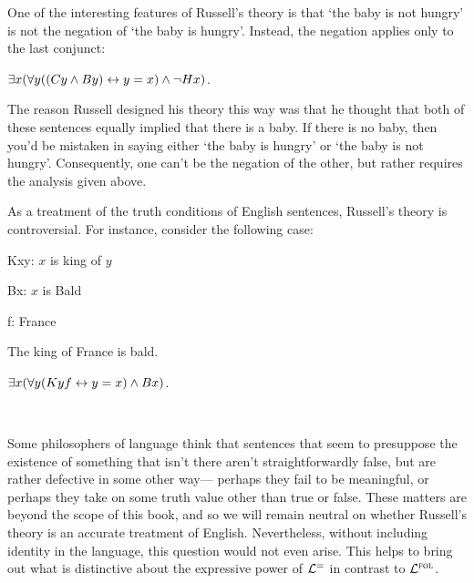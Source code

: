 One of the interesting features of Russell's theory is that `the baby is not hungry' is not the negation of `the baby is hungry'.
Instead, the negation applies only to the last conjunct:

\begin{earg}
  \item[\ex{Def4}] $\exists x (\forall y ((Cy \wedge By) \leftrightarrow y = x) \wedge \neg Hx)$.
\end{earg}

The reason Russell designed his theory this way was that he thought that both of these sentences equally implied that there is a baby.
If there is no baby, then you'd be mistaken in saying either `the baby is hungry' or `the baby is not hungry'.
Consequently, one can't be the negation of the other, but rather requires the analysis given above.

As a treatment of the truth conditions of English sentences, Russell's theory is controversial.
For instance, consider the following case:

\begin{multicols}{2}

\begin{ekey}
  \item[Kxy:] $x$ is king of $y$
  \item[Bx:] $x$ is Bald
  \item[f:] France
\end{ekey}

\begin{earg}
  \item[\ex{Def4}] The king of France is bald.
  \item[\ex{Def5}] $\exists x (\forall y (Kyf \leftrightarrow y = x) \wedge Bx)$.
  \item[] ~
\end{earg}

\end{multicols}

Some philosophers of language think that sentences that seem to presuppose the existence of something that isn't there aren't straightforwardly false, but are rather defective in some other way--- perhaps they fail to be meaningful, or perhaps they take on some truth value other than true or false.
These matters are beyond the scope of this book, and so we will remain neutral on whether Russell's theory is an accurate treatment of English.
Nevertheless, without including identity in the language, this question would not even arise.
This helps to bring out what is distinctive about the expressive power of $\mathcal{L}^{=}$ in contrast to $\mathcal{L}^{\textsc{fol}}$. 







